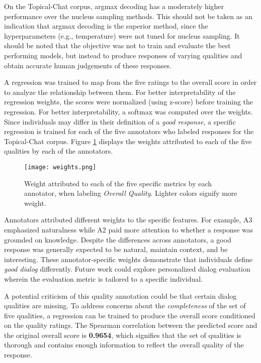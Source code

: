 \documentclass[11pt,a4paper]{article}
\begin{document}
On the Topical-Chat corpus, argmax decoding has a moderately higher performance over the nucleus sampling \citep{holtzman2019curious} methods. This should not be taken as an indication that argmax decoding is the superior method, since the hyperparameters (e.g., temperature) were not tuned for nucleus sampling. It should be noted that the objective was not to train and evaluate the best performing models, but instead to produce responses of varying qualities and obtain accurate human judgements of these responses.

A regression was trained to map from the five ratings to the overall score in order to analyze the relationship between them. For better interpretability of the regression weights, the scores were normalized (using z-score) before training the regression. For better interpretability, a softmax was computed over the weights. Since individuals may differ in their definition of a \textit{good response}, a specific regression is trained for each of the five annotators who labeled responses for the Topical-Chat corpus.  Figure \ref{fig:weights} displays the weights attributed to each of the five qualities by each of the annotators.

\begin{figure}
    \centering
    \texttt{[image: weights.png]}
    \caption{Weight attributed to each of the five specific metrics by each annotator, when labeling \textit{Overall Quality}. Lighter colors signify more weight.}
    \label{fig:weights}
\end{figure}

Annotators attributed different weights to the specific features. For example, A3 emphasized naturalness while A2 paid more attention to whether a response was grounded on knowledge. Despite the differences across annotators, a good response was generally expected to be natural, maintain context, and be interesting. These annotator-specific weights demonstrate that individuals define \textit{good dialog} differently. Future work could explore personalized dialog evaluation wherein the evaluation metric is tailored to a specific individual.

A potential criticism of this quality annotation could be that certain dialog qualities are missing. To address concerns about the \textit{completeness} of the set of five qualities, a regression can be trained to produce the overall score conditioned on the quality ratings. The Spearman correlation between the predicted score and the original overall score is \textbf{0.9654}, which signifies that the set of qualities is thorough and contains enough information to reflect the overall quality of the response.  
\label{analysis}
\end{document}
